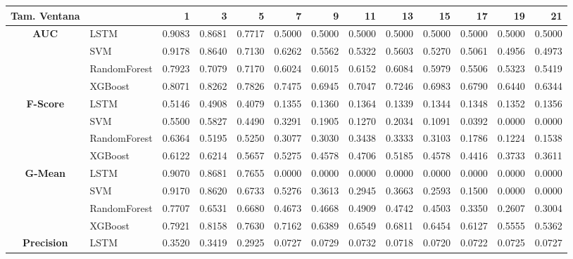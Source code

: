\begin{table}[h]
	\centering
	\begin{adjustbox}{max width=15cm}
		\begin{tabular}{|c|l|r|r|r|r|r|r|r|r|r|r|r|}
			\hline
			\textbf{Tam. Ventana} &         &      1  &      3  &      5  &      7  &      9  &      11 &      13 &      15 &      17 &      19 &      21 \\
			\hline
			\textbf{AUC} & LSTM &  0.9083 &  0.8681 &  0.7717 &  0.5000 &  0.5000 &  0.5000 &  0.5000 &  0.5000 &  0.5000 &  0.5000 &  0.5000 \\
			& SVM &  0.9178 &  0.8640 &  0.7130 &  0.6262 &  0.5562 &  0.5322 &  0.5603 &  0.5270 &  0.5061 &  0.4956 &  0.4973 \\
			& RandomForest &  0.7923 &  0.7079 &  0.7170 &  0.6024 &  0.6015 &  0.6152 &  0.6084 &  0.5979 &  0.5506 &  0.5323 &  0.5419 \\
			& XGBoost &  0.8071 &  0.8262 &  0.7826 &  0.7475 &  0.6945 &  0.7047 &  0.7246 &  0.6983 &  0.6790 &  0.6440 &  0.6344 \\
			\hline
			\textbf{F-Score} & LSTM &  0.5146 &  0.4908 &  0.4079 &  0.1355 &  0.1360 &  0.1364 &  0.1339 &  0.1344 &  0.1348 &  0.1352 &  0.1356 \\
			& SVM &  0.5500 &  0.5827 &  0.4490 &  0.3291 &  0.1905 &  0.1270 &  0.2034 &  0.1091 &  0.0392 &  0.0000 &  0.0000 \\
			& RandomForest &  0.6364 &  0.5195 &  0.5250 &  0.3077 &  0.3030 &  0.3438 &  0.3333 &  0.3103 &  0.1786 &  0.1224 &  0.1538 \\
			& XGBoost &  0.6122 &  0.6214 &  0.5657 &  0.5275 &  0.4578 &  0.4706 &  0.5185 &  0.4578 &  0.4416 &  0.3733 &  0.3611 \\
			\hline
			\textbf{G-Mean} & LSTM &  0.9070 &  0.8681 &  0.7655 &  0.0000 &  0.0000 &  0.0000 &  0.0000 &  0.0000 &  0.0000 &  0.0000 &  0.0000 \\
			& SVM &  0.9170 &  0.8620 &  0.6733 &  0.5276 &  0.3613 &  0.2945 &  0.3663 &  0.2593 &  0.1500 &  0.0000 &  0.0000 \\
			& RandomForest &  0.7707 &  0.6531 &  0.6680 &  0.4673 &  0.4668 &  0.4909 &  0.4742 &  0.4503 &  0.3350 &  0.2607 &  0.3004 \\
			& XGBoost &  0.7921 &  0.8158 &  0.7630 &  0.7162 &  0.6389 &  0.6549 &  0.6811 &  0.6454 &  0.6127 &  0.5555 &  0.5362 \\
			\hline
			\textbf{Precision} & LSTM &  0.3520 &  0.3419 &  0.2925 &  0.0727 &  0.0729 &  0.0732 &  0.0718 &  0.0720 &  0.0722 &  0.0725 &  0.0727 \\

\end{tabular}
\end{adjustbox}
\end{table}
